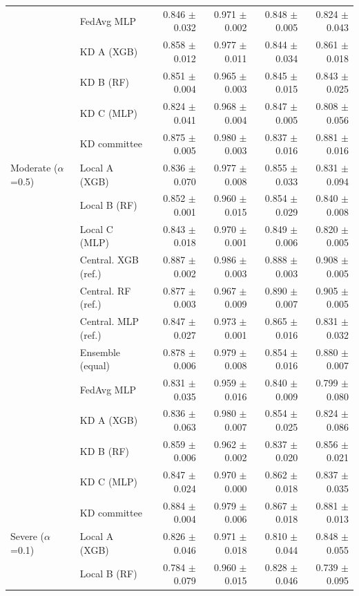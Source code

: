 \begin{table}[t]
\begin{tabular}{llrrrr}
 & FedAvg MLP & 0.846 $\pm$ 0.032 & 0.971 $\pm$ 0.002 & 0.848 $\pm$ 0.005 & 0.824 $\pm$ 0.043 \\
 & KD A (XGB) & 0.858 $\pm$ 0.012 & 0.977 $\pm$ 0.011 & 0.844 $\pm$ 0.034 & 0.861 $\pm$ 0.018 \\
 & KD B (RF) & 0.851 $\pm$ 0.004 & 0.965 $\pm$ 0.003 & 0.845 $\pm$ 0.015 & 0.843 $\pm$ 0.025 \\
 & KD C (MLP) & 0.824 $\pm$ 0.041 & 0.968 $\pm$ 0.004 & 0.847 $\pm$ 0.005 & 0.808 $\pm$ 0.056 \\
 & KD committee & 0.875 $\pm$ 0.005 & 0.980 $\pm$ 0.003 & 0.837 $\pm$ 0.016 & 0.881 $\pm$ 0.016 \\
\midrule
Moderate ($\alpha$=0.5) & Local A (XGB) & 0.836 $\pm$ 0.070 & 0.977 $\pm$ 0.008 & 0.855 $\pm$ 0.033 & 0.831 $\pm$ 0.094 \\
 & Local B (RF) & 0.852 $\pm$ 0.001 & 0.960 $\pm$ 0.015 & 0.854 $\pm$ 0.029 & 0.840 $\pm$ 0.008 \\
 & Local C (MLP) & 0.843 $\pm$ 0.018 & 0.970 $\pm$ 0.001 & 0.849 $\pm$ 0.006 & 0.820 $\pm$ 0.005 \\
 & Central. XGB (ref.) & 0.887 $\pm$ 0.002 & 0.986 $\pm$ 0.003 & 0.888 $\pm$ 0.003 & 0.908 $\pm$ 0.005 \\
 & Central. RF (ref.) & 0.877 $\pm$ 0.003 & 0.967 $\pm$ 0.009 & 0.890 $\pm$ 0.007 & 0.905 $\pm$ 0.005 \\
 & Central. MLP (ref.) & 0.847 $\pm$ 0.027 & 0.973 $\pm$ 0.001 & 0.865 $\pm$ 0.016 & 0.831 $\pm$ 0.032 \\
 & Ensemble (equal) & 0.878 $\pm$ 0.006 & 0.979 $\pm$ 0.008 & 0.854 $\pm$ 0.016 & 0.880 $\pm$ 0.007 \\
 & FedAvg MLP & 0.831 $\pm$ 0.035 & 0.959 $\pm$ 0.016 & 0.840 $\pm$ 0.009 & 0.799 $\pm$ 0.080 \\
 & KD A (XGB) & 0.836 $\pm$ 0.063 & 0.980 $\pm$ 0.007 & 0.854 $\pm$ 0.025 & 0.824 $\pm$ 0.086 \\
 & KD B (RF) & 0.859 $\pm$ 0.006 & 0.962 $\pm$ 0.002 & 0.837 $\pm$ 0.020 & 0.856 $\pm$ 0.021 \\
 & KD C (MLP) & 0.847 $\pm$ 0.024 & 0.970 $\pm$ 0.000 & 0.862 $\pm$ 0.018 & 0.837 $\pm$ 0.035 \\
 & KD committee & 0.884 $\pm$ 0.004 & 0.979 $\pm$ 0.006 & 0.867 $\pm$ 0.018 & 0.881 $\pm$ 0.013 \\
\midrule
Severe ($\alpha$=0.1) & Local A (XGB) & 0.826 $\pm$ 0.046 & 0.971 $\pm$ 0.018 & 0.810 $\pm$ 0.044 & 0.848 $\pm$ 0.055 \\
 & Local B (RF) & 0.784 $\pm$ 0.079 & 0.960 $\pm$ 0.015 & 0.828 $\pm$ 0.046 & 0.739 $\pm$ 0.095 \\

\end{tabular}
\end{table}
